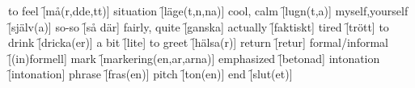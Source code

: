 \begin{questions}
    \begin{multicols}{2}
        \raggedcolumns
        \question to feel \f[må(r,dde,tt)]
        \question situation \f[läge(t,n,na)]
        \question cool, calm \f[lugn(t,a)]
        \question myself,yourself \f[själv(a)]
        \question so-so \f[så där]
        \question fairly, quite \f[ganska]
        \question actually \f[faktiskt]
        \question tired \f[trött]
        \question to drink \f[dricka(er)]
        \question a bit \f[lite]
        \question to greet \f[hälsa(r)]
        \question return \f[retur]
        \question formal/informal \f[(in)formell]
        \question mark \f[markering(en,ar,arna)]
        \question emphasized \f[betonad]
        \question intonation \f[intonation]
        \question phrase \f[fras(en)]
        \question pitch \f[ton(en)]
        \question end \f[slut(et)]
    \end{multicols}
\end{questions}
